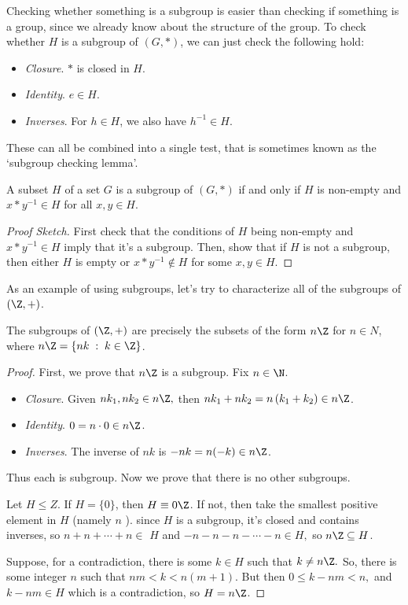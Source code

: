 \documentclass[a4]{scrreprt}
\begin{document}
Checking whether something is a subgroup is easier than checking if something is a group, since we already know about the structure of the group. To check whether $H$ is a subgroup of $(G, *)$, we can just check the following hold:
\begin{itemize}
	\item \emph{Closure}. $*$ is closed in $H$.
	\item \emph{Identity}. $e \in H$.
	\item \emph{Inverses}. For $h \in H$, we also have $h^{-1} \in H$. 
\end{itemize}

These can all be combined into a single test, that is sometimes known as the `subgroup checking lemma'.

\begin{lemma}
	A subset $H$ of a set $G$ is a subgroup of $(G, *)$ if and only if $H$ is non-empty and $x * y^{-1} \in H$ for all $x, y \in H$.
\end{lemma}
\begin{proof}[Proof Sketch]
	First check that the conditions of $H$ being non-empty and $x * y^{-1} \in H$ imply that it's a subgroup. Then, show that if $H$ is not a subgroup, then either $H$ is empty or $x * y^{-1} \not\in H$ for some $x, y \in H$.
\end{proof}

As an example of using subgroups, let's try to characterize all of the subgroups of $(\Z, +)$.

\begin{theorem}[Subgroups of $\Z$]\label{thm:subgroups-of-z}
	The subgroups of $(\Z, +)$ are precisely the subsets of the form $n \Z$ for $n \in N$, where $n\Z = \{n k \; : \; k \in \Z\}$.
\end{theorem}
\begin{proof}
	First, we prove that $n \Z$ is a subgroup. Fix $n \in \N$.
	\begin{itemize}
		\item \emph{Closure}. Given $n k_{1}, n k_{2} \in n \Z,$ then $n k_{1}+n k_{2}=n\left(k_{1}+k_{2}\right) \in n \Z$.
		\item \emph{Identity}. $0 =n \cdot 0 \in n \Z$.
		\item \emph{Inverses}. The inverse of $n k$ is $-n k=n(-k) \in n \Z$.
	\end{itemize}
Thus each is subgroup. Now we prove that there is no other subgroups.

Let $H \leq Z$. If $H=\{0\}$, then $H \equiv 0 \Z$. If not, then take the smallest positive element in $H$ (namely $n$ ). since $H$ is a subgroup, it's closed and contains inverses, so $n+n+\cdots+n \in$ $H$ and $-n-n-n-\cdots-n \in H,$ so $n \Z \subseteq H$.

Suppose, for a contradiction, there is some $k \in H$ such that $k \neq n \Z .$ So, there is some integer $n$ such that $n m<k<n(m+1) .$ But then $0 \leq k-n m<n,$ and $k-n m \in H$ which is a contradiction, so $H=n \Z$.
\end{proof}
\end{document}
